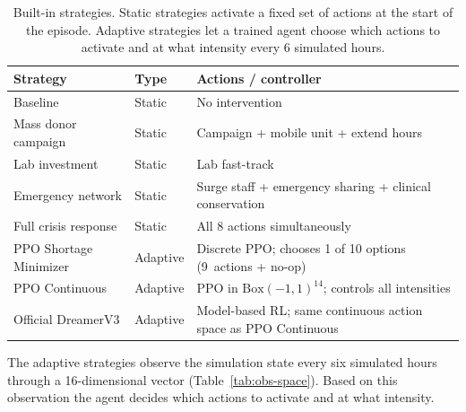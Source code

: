 \begin{table}[htbp]
\centering
\caption{Built-in strategies.  Static strategies activate a fixed set of
         actions at the start of the episode.  Adaptive strategies let a
         trained agent choose which actions to activate and at what intensity
         every 6 simulated hours.}
\label{tab:strategies}
\small
\begin{tabular}{@{}llp{6.8cm}@{}}
\toprule
\textbf{Strategy} & \textbf{Type} & \textbf{Actions / controller} \\
\midrule
Baseline               & Static   & No intervention \\
Mass donor campaign    & Static   & Campaign + mobile unit + extend hours \\
Lab investment         & Static   & Lab fast-track \\
Emergency network      & Static   & Surge staff + emergency sharing
                                    + clinical conservation \\
Full crisis response   & Static   & All 8 actions simultaneously \\
\addlinespace
PPO Shortage Minimizer & Adaptive & Discrete PPO; chooses 1 of 10 options
                                    (9~actions + no-op) \\
PPO Continuous         & Adaptive & PPO in $\text{Box}(-1,1)^{14}$;
                                    controls all intensities \\
Official DreamerV3     & Adaptive & Model-based RL; same continuous action
                                    space as PPO Continuous \\
\bottomrule
\end{tabular}
\end{table}

The adaptive strategies observe the simulation state every six simulated
hours through a 16-dimensional vector (Table~\ref{tab:obs-space}).  Based on
this observation the agent decides which actions to activate and at what
intensity.


